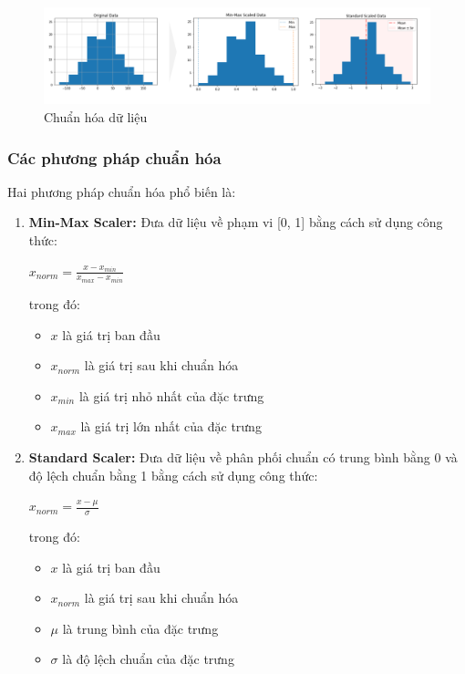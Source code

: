 \begin{figure}[H]
    \centering
    \includegraphics[width=\textwidth,height=\textheight,keepaspectratio]{Images/Theoretical basis/normalization.png}
    \caption{Chuẩn hóa dữ liệu}
\end{figure}

\subsubsection{Các phương pháp chuẩn hóa}

Hai phương pháp chuẩn hóa phổ biến là:

\begin{enumerate}
    \item \textbf{Min-Max Scaler:} Đưa dữ liệu về phạm vi [0, 1] bằng cách sử dụng công thức:

    $x_{norm} = \frac{x - x_{min}}{x_{max} - x_{min}}$

    trong đó: 
    \begin{itemize}
        \item $x$ là giá trị ban đầu
        \item $x_{norm}$ là giá trị sau khi chuẩn hóa 
        \item $x_{min}$ là giá trị nhỏ nhất của đặc trưng 
        \item $x_{max}$ là giá trị lớn nhất của đặc trưng 
    \end{itemize}
    \item \textbf{Standard Scaler:} Đưa dữ liệu về phân phối chuẩn có trung bình bằng 0 và độ lệch chuẩn bằng 1 bằng cách sử dụng công thức:

    $x_{norm} = \frac{x - \mu}{\sigma}$

    trong đó: 
    \begin{itemize}
        \item $x$ là giá trị ban đầu 
        \item $x_{norm}$ là giá trị sau khi chuẩn hóa 
        \item $\mu$ là trung bình của đặc trưng 
        \item $\sigma$ là độ lệch chuẩn của đặc trưng 
    \end{itemize}
\end{enumerate}

